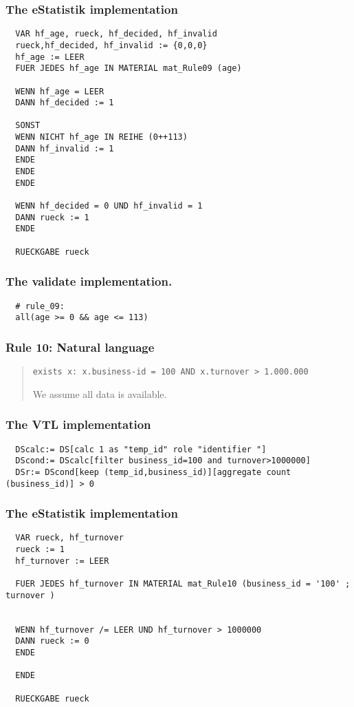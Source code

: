 \subsubsection*{The eStatistik implementation}
\begin{verbatim}
  VAR hf_age, rueck, hf_decided, hf_invalid
  rueck,hf_decided, hf_invalid := {0,0,0}
  hf_age := LEER
  FUER JEDES hf_age IN MATERIAL mat_Rule09 (age)

  WENN hf_age = LEER
  DANN hf_decided := 1

  SONST
  WENN NICHT hf_age IN REIHE (0++113)
  DANN hf_invalid := 1
  ENDE
  ENDE
  ENDE

  WENN hf_decided = 0 UND hf_invalid = 1
  DANN rueck := 1
  ENDE

  RUECKGABE rueck
\end{verbatim}
\subsubsection*{The validate implementation.}
\begin{verbatim}
  # rule_09:
  all(age >= 0 && age <= 113)
\end{verbatim}


\newpage

\subsubsection*{  Rule 10: Natural language}
\begin{quote}


\begin{verbatim}
exists x: x.business-id = 100 AND x.turnover > 1.000.000
\end{verbatim}

We assume all data is available.


\end{quote}
\subsubsection*{The VTL implementation}
\begin{verbatim}
  DScalc:= DS[calc 1 as "temp_id" role "identifier "]
  DScond:= DScalc[filter business_id=100 and turnover>1000000]
  DSr:= DScond[keep (temp_id,business_id)][aggregate count (business_id)] > 0
\end{verbatim}
\subsubsection*{The eStatistik implementation}
\begin{verbatim}
  VAR rueck, hf_turnover
  rueck := 1
  hf_turnover := LEER

  FUER JEDES hf_turnover IN MATERIAL mat_Rule10 (business_id = '100' ; turnover )


  WENN hf_turnover /= LEER UND hf_turnover > 1000000
  DANN rueck := 0
  ENDE

  ENDE

  RUECKGABE rueck
\end{verbatim}
